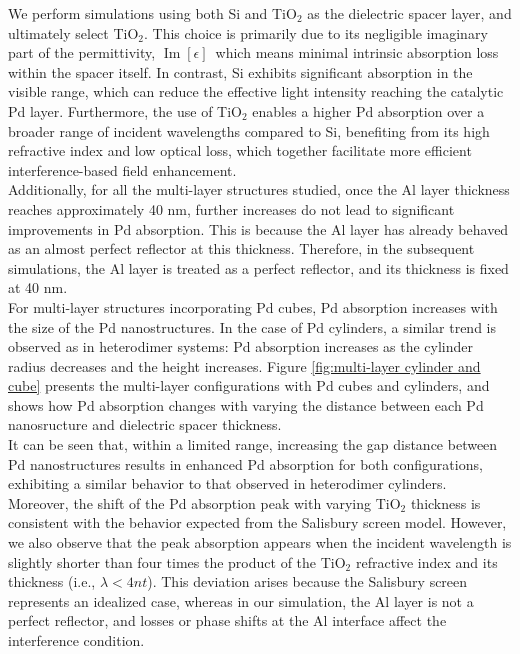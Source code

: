 \documentclass[journal]{IEEEtran}
\begin{document}
\indent
We perform simulations using both Si and TiO$_2$ as the dielectric spacer layer, and ultimately select TiO$_2$. This choice is primarily due to its negligible imaginary part of the permittivity, $\operatorname{Im}[\epsilon]$\, which means minimal intrinsic absorption loss within the spacer itself. In contrast, Si exhibits significant absorption in the visible range, which can reduce the effective light intensity reaching the catalytic Pd layer. Furthermore, the use of TiO$_2$ enables a higher Pd absorption over a broader range of incident wavelengths compared to Si, benefiting from its high refractive index and low optical loss, which together facilitate more efficient interference-based field enhancement.\\
\indent
Additionally, for all the multi-layer structures studied, once the Al layer thickness reaches approximately 40 nm, further increases do not lead to significant improvements in Pd absorption. This is because the Al layer has already behaved as an almost perfect reflector at this thickness. Therefore, in the subsequent simulations, the Al layer is treated as a perfect reflector, and its thickness is fixed at 40 nm.\\
\indent
For multi-layer structures incorporating Pd cubes, Pd absorption increases with the size of the Pd nanostructures. In the case of Pd cylinders, a similar trend is observed as in heterodimer systems: Pd absorption increases as the cylinder radius decreases and the height increases. Figure \ref{fig:multi-layer cylinder and cube} presents the multi-layer configurations with Pd cubes and cylinders, and shows how Pd absorption changes with varying the distance between each Pd nanosructure and dielectric spacer thickness.\\
\indent
It can be seen that, within a limited range, increasing the gap distance between Pd nanostructures results in enhanced Pd absorption for both configurations, exhibiting a similar behavior to that observed in heterodimer cylinders.\\
\indent
Moreover, the shift of the Pd absorption peak with varying TiO$_2$ thickness is consistent with the behavior expected from the Salisbury screen model. However, we also observe that the peak absorption appears when the incident wavelength is slightly shorter than four times the product of the TiO$_2$ refractive index and its thickness (i.e., $\lambda < 4nt$). This deviation arises because the Salisbury screen represents an idealized case, whereas in our simulation, the Al layer is not a perfect reflector, and losses or phase shifts at the Al interface affect the interference condition.\\
\end{document}
